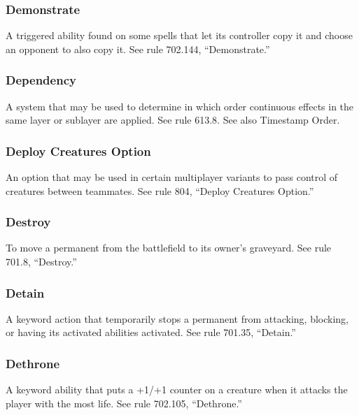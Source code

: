 {{{{{{\subsubsection*{Demonstrate}

A triggered ability found on some spells that let its controller copy it and choose an opponent to also copy it. See rule 702.144, “Demonstrate.”

\subsubsection*{Dependency}

A system that may be used to determine in which order continuous effects in the same layer or sublayer are applied. See rule 613.8. See also Timestamp Order.

\subsubsection*{Deploy Creatures Option}

An option that may be used in certain multiplayer variants to pass control of creatures between teammates. See rule 804, “Deploy Creatures Option.”

\subsubsection*{Destroy}

To move a permanent from the battlefield to its owner’s graveyard. See rule 701.8, “Destroy.”

\subsubsection*{Detain}

A keyword action that temporarily stops a permanent from attacking, blocking, or having its activated abilities activated. See rule 701.35, “Detain.”

\subsubsection*{Dethrone}

A keyword ability that puts a +1/+1 counter on a creature when it attacks the player with the most life. See rule 702.105, “Dethrone.”

}}}}}}
